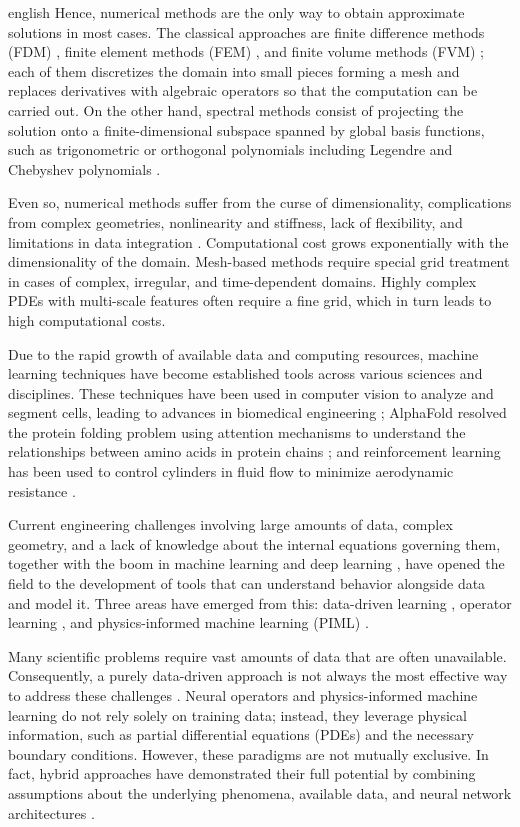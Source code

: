 \documentclass[12pt,letterpaper,twoside]{book}
\begin{document}
\begin{hyphenrules}{english}
Hence, numerical methods are the only way to obtain approximate solutions in most cases. The classical
approaches are finite difference methods (FDM) \cite{strikwerda2004}, finite element methods (FEM)
\cite{zienkiewicz2013}, and finite volume methods (FVM) \cite{moukalled2016}; each of them
discretizes the domain into small pieces forming a mesh and replaces derivatives with algebraic
operators so that the computation can be carried out. On the other hand, spectral methods consist of
projecting the solution onto a finite-dimensional subspace spanned by global basis functions, such as
trigonometric or orthogonal polynomials including Legendre and Chebyshev polynomials
\cite{shen2011}.

Even so, numerical methods suffer from the curse of dimensionality, complications from complex
geometries, nonlinearity and stiffness, lack of flexibility, and limitations in data integration
\cite{schwencke2025thesis}. Computational cost grows exponentially with the dimensionality of the
domain. Mesh-based methods require special grid treatment in cases of complex, irregular, and
time-dependent domains. Highly complex PDEs with multi-scale features often require a fine grid,
which in turn leads to high computational costs.

Due to the rapid growth of available data and computing resources, machine learning techniques have
become established tools across various sciences and disciplines. These techniques have been used in
computer vision to analyze and segment cells, leading to advances in biomedical engineering
\cite{ronneberger2015}; AlphaFold resolved the protein folding problem using attention mechanisms
to understand the relationships between amino acids in protein chains \cite{jumper2021}; and
reinforcement learning has been used to control cylinders in fluid flow to minimize aerodynamic
resistance \cite{rabault2019}.

Current engineering challenges involving large amounts of data, complex geometry, and a lack of
knowledge about the internal equations governing them, together with the boom in machine learning and
deep learning \cite{bishop2006,goodfellow2016,bach2024}, have opened the field to the development
of tools that can understand behavior alongside data and model it. Three areas have emerged from this:
data-driven learning \cite{fiorini2025,brunton2016,chen2018}, operator learning
\cite{kovachki2021,li2021fno}, and physics-informed machine learning (PIML)
\cite{raissi2019,cuomo2022}.

Many scientific problems require vast amounts of data that are often unavailable. Consequently, a
purely data-driven approach is not always the most effective way to address these challenges
\cite{wu2020}. Neural operators and physics-informed machine learning do not rely solely on
training data; instead, they leverage physical information, such as partial differential equations
(PDEs) and the necessary boundary conditions. However, these paradigms are not mutually exclusive. In
fact, hybrid approaches have demonstrated their full potential by combining assumptions about the
underlying phenomena, available data, and neural network architectures
\cite{raissi2020hidden,kissas2020,nguyen2022}.


\end{hyphenrules}
\end{document}
